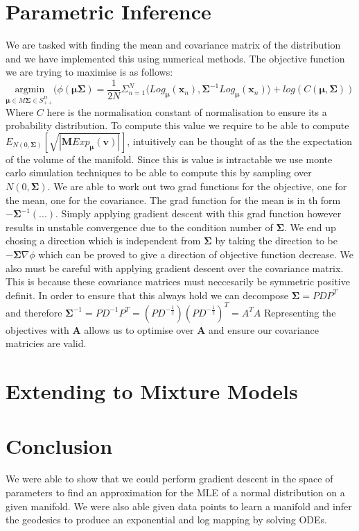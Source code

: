\documentclass{article}
\begin{document}
\section{Parametric Inference}
We are tasked with finding the mean and covariance matrix of the distribution and we have implemented this using numerical methods.
The objective function we are trying to maximise is as follows:
$$\underset{\bm{\mu} \in M \bm{\Sigma} \in S_{++}^D}{\text{argmin}}(\phi(\bm{\mu}\bm{\Sigma})
=\frac{1}{2N}\Sigma_{n=1}^N\langle Log_{\bm{\mu}}(\bm{x}_n),
\bm{\Sigma}^{-1}Log_{\bm{\mu}}(\bm{x}_n)\rangle
+ log(C(\bm{\mu},\bm{\Sigma}))$$
Where $C$ here is the normalisation constant of normalisation to ensure its a probability distribution.
To compute this value we require to be able to compute $E_{N(0,\bm{\Sigma})}[\sqrt{|\bm{M}Exp_{\bm{\mu}}(\bm{v})|}]$,
intuitively can be thought of as the the expectation of the volume of the manifold.
Since this is value is intractable we use monte carlo simulation techniques to be able to compute this by sampling over $N(0,\bm{\Sigma})$.
We are able to work out two grad functions for the objective, one for the mean, one for the covariance.
The grad function for the mean is in th form $-\bm{\Sigma}^{-1}(...)$.
Simply applying gradient descent with this grad function however results in unstable convergence due to the condition number of $\bm{\Sigma}$.
We end up chosing a direction which is independent from $\bm{\Sigma}$ by taking the direction to be $-\bm{\Sigma}\nabla\phi$ which can be proved to give a direction of objective function decrease.
We also must be careful with applying gradient descent over the covariance matrix.
This is because these covariance matrices must neccesarily be symmetric positive definit.
In order to ensure that this always hold we can decompose $\bm{\Sigma} = PDP^T$ and therefore $\bm{\Sigma}^{-1} = PD^{-1}P^T= (PD^{-\frac{1}{2}})(PD^{-\frac{1}{2}})^T=A^TA$
Representing the objectives with $\bm{A}$ allows us to optimise over $\bm{A}$ and ensure our covariance matricies are valid.
\section{Extending to Mixture Models}
\section{Conclusion}
We were able to show that we could perform gradient descent in the space of parameters to find an approximation for the MLE of a normal distribution on a given manifold.
We were also able given data points to learn a manifold and infer the geodesics to produce an exponential and log mapping by solving ODEs.
\end{document}
